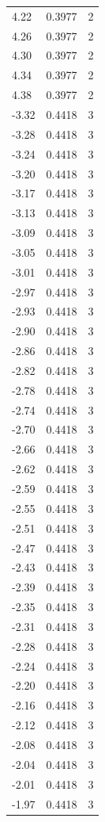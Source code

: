 \begin{longtable}{lrr}
  4.22 & 0.3977 & 2 \\
  4.26 & 0.3977 & 2 \\
  4.30 & 0.3977 & 2 \\
  4.34 & 0.3977 & 2 \\
  4.38 & 0.3977 & 2 \\
  -3.32 & 0.4418 & 3 \\
  -3.28 & 0.4418 & 3 \\
  -3.24 & 0.4418 & 3 \\
  -3.20 & 0.4418 & 3 \\
  -3.17 & 0.4418 & 3 \\
  -3.13 & 0.4418 & 3 \\
  -3.09 & 0.4418 & 3 \\
  -3.05 & 0.4418 & 3 \\
  -3.01 & 0.4418 & 3 \\
  -2.97 & 0.4418 & 3 \\
  -2.93 & 0.4418 & 3 \\
  -2.90 & 0.4418 & 3 \\
  -2.86 & 0.4418 & 3 \\
  -2.82 & 0.4418 & 3 \\
  -2.78 & 0.4418 & 3 \\
  -2.74 & 0.4418 & 3 \\
  -2.70 & 0.4418 & 3 \\
  -2.66 & 0.4418 & 3 \\
  -2.62 & 0.4418 & 3 \\
  -2.59 & 0.4418 & 3 \\
  -2.55 & 0.4418 & 3 \\
  -2.51 & 0.4418 & 3 \\
  -2.47 & 0.4418 & 3 \\
  -2.43 & 0.4418 & 3 \\
  -2.39 & 0.4418 & 3 \\
  -2.35 & 0.4418 & 3 \\
  -2.31 & 0.4418 & 3 \\
  -2.28 & 0.4418 & 3 \\
  -2.24 & 0.4418 & 3 \\
  -2.20 & 0.4418 & 3 \\
  -2.16 & 0.4418 & 3 \\
  -2.12 & 0.4418 & 3 \\
  -2.08 & 0.4418 & 3 \\
  -2.04 & 0.4418 & 3 \\
  -2.01 & 0.4418 & 3 \\
  -1.97 & 0.4418 & 3 \\

\end{longtable}
